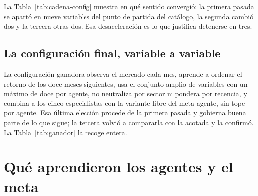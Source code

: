 \begin{table}[htbp]
  \centering
  \small
  \caption{Qué cambió cada pasada respecto de su punto de partida.}
  \label{tab:cadena-config}
  
  \caption*{Cada pasada se compara con su configuración de partida. El Anexo~\ref{anexo:catalogo}
  reproduce el catálogo completo con el valor final de las treinta y tres variables.}
\end{table}

La Tabla~\ref{tab:cadena-config} muestra en qué sentido convergió: la primera pasada se apartó en
nueve variables del punto de partida del catálogo, la segunda cambió dos y la tercera otras dos. Esa
desaceleración es lo que justifica detenerse en tres.

\subsection{La configuración final, variable a variable}

La configuración ganadora observa el mercado cada mes, aprende a ordenar el retorno de los doce
meses siguientes, usa el conjunto amplio de variables con un máximo de doce por agente, no
neutraliza por sector ni pondera por recencia, y combina a los cinco especialistas con la variante
libre del meta-agente, sin tope por agente. Esa última elección procede de la primera
pasada y gobierna buena parte de lo que sigue; la tercera volvió a compararla con la acotada y la
confirmó. La Tabla~\ref{tab:ganador} la recoge entera.

\begin{table}[htbp]
  \centering
  \small
  \caption{La configuración predictiva ganadora, variable a variable.}
  \label{tab:ganador}
  
  \caption*{Las veintiuna variables predictivas del catálogo y el valor con el que quedó congelado
  el sistema. Las doce variables de cartera se omiten aquí porque en esta fase conservaban el valor
  por defecto: las que el trabajo adopta se deciden después y se presentan en el
  Capítulo~\ref{chap:resultados-economicos}. El Anexo~\ref{anexo:catalogo} añade, para cada una, la
  rejilla completa de valores que estaban disponibles y no se eligieron.}
\end{table}

\section{Qué aprendieron los agentes y el meta}
\label{sec:meta-aprende}

